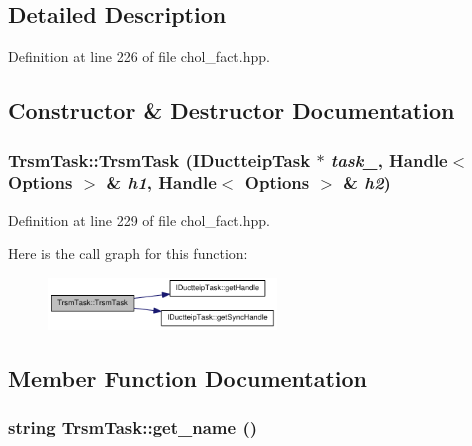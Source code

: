 \subsection{Detailed Description}


Definition at line 226 of file chol\_\-fact.hpp.

\subsection{Constructor \& Destructor Documentation}
\hypertarget{struct_trsm_task_a4c2b483737bcde446760a92ce1947640}{
\subsubsection[{TrsmTask}]{\setlength{\rightskip}{0pt plus 5cm}TrsmTask::TrsmTask ({\bf IDuctteipTask} $\ast$ {\em task\_\-}, \/  Handle$<$ {\bf Options} $>$ \& {\em h1}, \/  Handle$<$ {\bf Options} $>$ \& {\em h2})}}
\label{struct_trsm_task_a4c2b483737bcde446760a92ce1947640}


Definition at line 229 of file chol\_\-fact.hpp.

Here is the call graph for this function:\nopagebreak
\begin{figure}[H]
\begin{center}
\leavevmode
\includegraphics[width=172pt]{struct_trsm_task_a4c2b483737bcde446760a92ce1947640_cgraph}
\end{center}
\end{figure}


\subsection{Member Function Documentation}
\hypertarget{struct_trsm_task_a8d5ce47ea63b7601eda61cc6468ee2eb}{
\subsubsection[{get\_\-name}]{\setlength{\rightskip}{0pt plus 5cm}string TrsmTask::get\_\-name ()}}
\label{struct_trsm_task_a8d5ce47ea63b7601eda61cc6468ee2eb}


